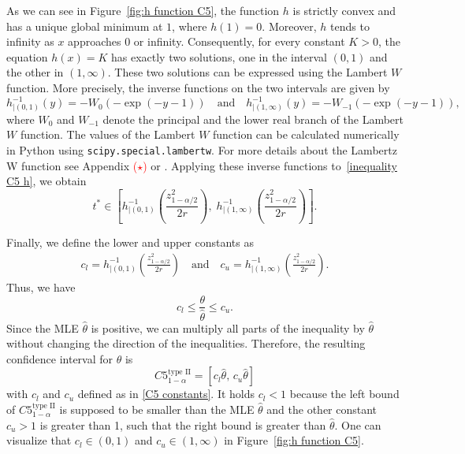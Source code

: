 As we can see in Figure~\ref{fig:h function C5}, the function \(h\) is strictly convex and has a unique global minimum at \(1\), where \(h(1)=0\). Moreover, \(h\) tends to infinity as \(x\) approaches $0$ or infinity. Consequently, for every constant \(K>0\), the equation \(h(x)=K\) has exactly two solutions, one in the interval \((0,1)\) and the other in \((1,\infty)\).
These two solutions can be expressed using the Lambert \(W\) function. More precisely, the inverse functions on the two intervals are given by
\begin{equation} \label{inverse of h}
	h^{-1}_{|(0,1)}(y)
	=
	-W_0\left(-\exp(-y-1)\right)
	\quad \text{and} \quad
	h^{-1}_{|(1,\infty)}(y)
	=
	-W_{-1}\left(-\exp(-y-1)\right),
\end{equation}
where \(W_0\) and \(W_{-1}\) denote the principal and the lower real branch of the Lambert \(W\) function.
The values of the Lambert \(W\) function can be calculated numerically in Python using \texttt{scipy.special.lambertw}.
For more details about the Lambertz W function see Appendix \textcolor{red}{($\star$)} or \cite{veberic2010having}.
Applying these inverse functions to~\eqref{inequality C5 h}, we obtain
\[
t^* \in
\left[
h^{-1}_{|(0,1)}
\left(\frac{z_{1-\alpha/2}^2}{2r}\right),
\;
h^{-1}_{|(1,\infty)}
\left(\frac{z_{1-\alpha/2}^2}{2r}\right)
\right].
\]

Finally, we define the lower and upper constants as
\begin{align} \label{C5 constants}
	c_l =
	h^{-1}_{|(0,1)}
	\left(\frac{z_{1-\alpha/2}^2}{2r}\right)
	\quad \text{and} \quad
	c_u =
	h^{-1}_{|(1,\infty)}
	\left(\frac{z_{1-\alpha/2}^2}{2r}\right).
\end{align}
Thus, we have
\[
c_l \leq \frac{\theta}{\hat{\theta}} \leq c_u.
\]
Since the MLE \(\hat{\theta}\) is positive, we can multiply all parts of the inequality by \(\hat{\theta}\) without changing the direction of the inequalities. Therefore, the resulting confidence interval for \(\theta\) is
\begin{equation*}
	C5_{1-\alpha}^{\text{type II}}
	=
	[c_l\hat{\theta},\,c_u\hat{\theta}]
\end{equation*}
with $c_l$ and $c_u$ defined as in \eqref{C5 constants}.
It holds $c_l < 1$ because the left bound of $C5_{1-\alpha}^{\text{type II}}$ is supposed to be smaller than the MLE $\hat \theta$ and the other constant $c_u > 1$ is greater than 1, such that the right bound is greater than $\hat \theta$. One can visualize that $c_l \in (0, 1)$ and $c_u \in (1, \infty)$ in Figure~\ref{fig:h function C5}.

